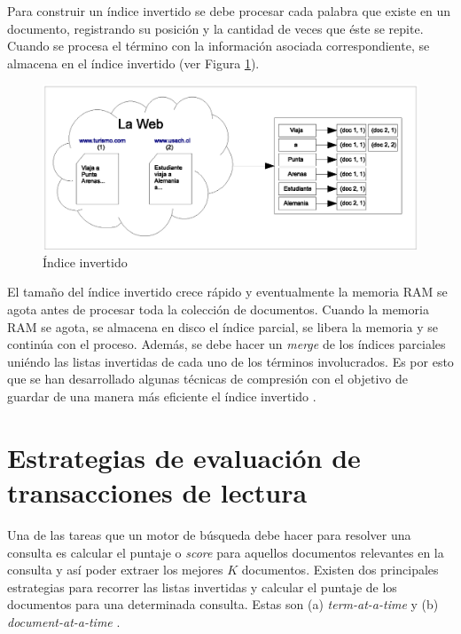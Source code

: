 Para construir un índice invertido \citep{Baeza-Yates:2011, Salton:2003} se debe procesar cada palabra que existe en un documento, registrando su posición y la cantidad de veces que éste se repite. Cuando se procesa el término con la información asociada correspondiente, se almacena en el índice invertido (ver Figura \ref{fig:invertedindex}).

\begin{figure}[!th]
\centering
\includegraphics[scale=.75]{images/invertedindex.eps}
\caption{\'Indice invertido}
\label{fig:invertedindex}
\end{figure}

El tamaño del índice invertido crece rápido y eventualmente la memoria RAM se agota antes de procesar toda la colección de documentos. Cuando la memoria RAM se agota, se almacena en disco el índice parcial, se libera la memoria y se continúa con el proceso. Además, se debe hacer un \textit{merge} de los índices parciales uniéndo las listas invertidas de cada uno de los términos involucrados. Es por esto que se han desarrollado algunas técnicas de compresión con el objetivo de guardar de una manera más eficiente el índice invertido \citep{Arroyuelo:2013, Baeza-Yates:2011, Yan:2009}.

\section{Estrategias de evaluaci\'on de transacciones de lectura}
\label{marco:eeq}
Una de las tareas que un motor de búsqueda debe hacer para resolver una consulta es calcular el puntaje o \textit{score} para aquellos documentos relevantes en la consulta y así poder extraer los mejores $K$ documentos. Existen dos principales estrategias para recorrer las listas invertidas y calcular el puntaje de los documentos para una determinada consulta. Estas son (a) \textit{term-at-a-time} \citep{Buckley:1985, Turtle:1995} y (b) \textit{document-at-a-time} \citep{Broder:2003, Turtle:1995}.

